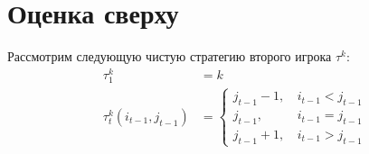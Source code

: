 \section{Оценка сверху}
\label{sec:upper_bound}
Рассмотрим следующую чистую стратегию второго игрока $ \tau^k $:
\begin{equation}
\label{eq:strategy:sp}
\begin{aligned}
\tau_1^k &= k \\
\tau_t^k(i_{t-1}, j_{t-1}) &= \begin{cases}
    j_{t-1} - 1, &\, i_{t-1} < j_{t-1} \\
    j_{t-1}, &\, i_{t-1} = j_{t-1} \\
    j_{t-1} + 1, &\, i_{t-1} > j_{t-1}
\end{cases}
\end{aligned}
\end{equation}


